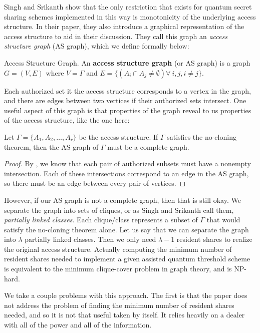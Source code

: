 Singh and Srikanth show that the only restriction that exists for quantum secret sharing schemes implemented in this way is monotonicity of the underlying access structure. In their paper, they also introduce a graphical representation of the access structure to aid in their discussion. They call this graph an \textit{access structure graph} (AS graph), which we define formally below:

\begin{definition}{Access Structure Graph.}
    \label{defn:access-structure-graph}
    An \textbf{access structure graph} (or AS graph) is a graph $G = (V,E)$ where $V = \Gamma$ and $E = \{(A_i \cap A_j \neq \emptyset) \forall\:i,j,i\neq j\}$.
\end{definition}

Each authorized set it the access structure corresponds to a vertex in the graph, and there  are edges between two vertices if their authorized sets intersect. One useful aspect of this graph is that properties of the graph reveal to us properties of the access structure, like the one here:

\begin{proposition}
    \label{prop:complete-as-graph}
    Let $\Gamma = \{A_1,A_2,\dots,A_r\}$ be the access structure. If $\Gamma$ satisfies the no-cloning theorem, then the AS graph of $\Gamma$ must be a complete graph.
\end{proposition}

\begin{proof}
    By , we know that each pair of authorized subsets must have a nonempty intersection. Each of these intersections correspond to an edge in the AS graph, so there must be an edge between every pair of vertices.
\end{proof}

However, if our AS graph is not a complete graph, then that is still okay. We separate the graph into sets of cliques, or as Singh and Srikanth call them, \textit{partially linked classes}. Each clique/class represents a subset of $\Gamma$ that would satisfy the no-cloning theorem alone. Let us say that we can separate the graph into $\lambda$ partially linked classes. Then we only need $\lambda - 1$ resident shares to realize the original access structure. Actually computing the minimum number of resident shares needed to implement a given assisted quantum threshold scheme is equivalent to the minimum clique-cover problem in graph theory, and is NP-hard.

We take a couple problems with this approach. The first is that the paper does not address the problem of finding the minimum number of resident shares needed, and so it is not that useful taken by itself. It relies heavily on a dealer with all of the power and all of the information. 

